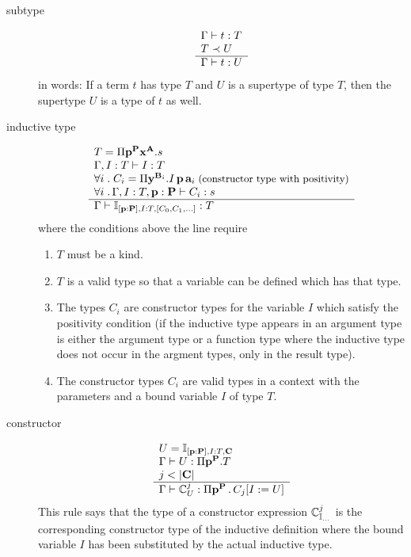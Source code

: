 \begin{definition}
\begin{description}
  \item[subtype]
    $$
    \begin{array}{l} \Gamma \vdash t : T
      \\
      T \prec U
     \\ \hline \Gamma \vdash t: U\end{array}
    $$
    in words: If a term $t$ has type $T$ and $U$ is a supertype of type $T$,
    then the supertype $U$ is a type of $t$ as well.

  \item[inductive type]
    $$
    \begin{array}{l}  T = \Pi \mathbf{p}^{\mathbf{P}} \mathbf{x}^{\mathbf{A}}.s
      \\
      \Gamma, I:T \vdash I:T
      \\
      \forall i\;.\; C_i = \Pi \mathbf{y}^{\mathbf{B}_i}. I \,\mathbf{p} \, \mathbf{a}_i
      \;\text{\small(constructor type with positivity)}
      \\
      \forall i\;.\, \Gamma, I:T, \mathbf{p}:\mathbf{P} \vdash C_i : s
     \\ \hline 
      \Gamma \vdash
      \mathbb{I}_{[\mathbf{p}:\mathbf{P}], I:T, [C_0,C_1,\ldots]}
      :
      T
    \end{array}
    $$
    where the conditions above the line require
    \begin{enumerate}
    \item $T$ must be a kind.

    \item $T$ is a valid type so that a
      variable can be defined which has that type.

    \item The types $C_i$ are constructor types for the variable $I$ which
      satisfy the positivity condition (if the inductive
      type appears in an argument type is either the argument type or a
      function type where the inductive type does not occur in the argment
      types, only in the result type).

    \item The constructor types $C_i$ are valid types in a context with the
      parameters and a bound variable $I$ of type $T$.
    \end{enumerate}


  \item[constructor]
    $$
    \begin{array}{l} 
      U = \mathbb{I}_{[\mathbf{p}:\mathbf{P}], I:T, \mathbf{C}}
      \\
      \Gamma
      \vdash
      U
      :
      \Pi \mathbf{p}^{\mathbf{P}}.T
      \\
      j < |\mathbf{C}|
     \\ \hline 
      \Gamma \vdash
      \mathbb{C}^j_U
      :
      \Pi \mathbf{p}^{\mathbf{P}} \,.\, C_j[I := U]
    \end{array}
    $$
    This rule says that the type of a constructor expression
    $\mathbb{C}^j_{\mathbb{I}_{\ldots}}$ is the corresponding constructor type
    of the inductive definition where the bound variable $I$ has been
    substituted by the actual inductive type.



\end{description}
\end{definition}
